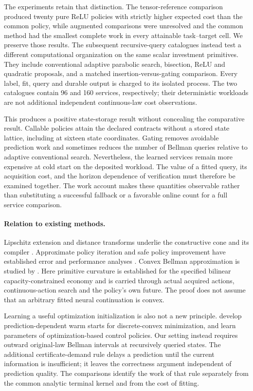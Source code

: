 \documentclass[ecta,nameyear,draft]{econsocart}
\begin{document}
The experiments retain that distinction. The tensor-reference comparison produced twenty pure ReLU policies with strictly higher expected cost than the common policy, while augmented comparisons were unresolved and the common method had the smallest complete work in every attainable task--target cell. We preserve those results. The subsequent recursive-query catalogues instead test a different computational organization on the same scalar investment primitives. They include conventional adaptive parabolic search, bisection, ReLU and quadratic proposals, and a matched insertion-versus-gating comparison. Every label, fit, query and durable output is charged to its isolated process. The two catalogues contain 96 and 160 services, respectively; their deterministic workloads are not additional independent continuous-law cost observations.

This produces a positive state-storage result without concealing the comparative result. Callable policies attain the declared contracts without a stored state lattice, including at sixteen state coordinates. Gating removes avoidable prediction work and sometimes reduces the number of Bellman queries relative to adaptive conventional search. Nevertheless, the learned services remain more expensive at cold start on the deposited workload. The value of a fitted query, its acquisition cost, and the horizon dependence of verification must therefore be examined together. The work account makes these quantities observable rather than substituting a successful fallback or a favorable online count for a full service comparison.

\paragraph{Relation to existing methods.}
Lipschitz extension and distance transforms underlie the constructive cone and its compiler \citep{mcshane1934,felzenszwalb2012}. Approximate policy iteration and safe policy improvement have established error and performance analyses \citep{munos2003,pirotta2013,scherrer2015}. Convex Bellman approximation is studied by \citet{yang2020convex}. Here primitive curvature is established for the specified bilinear capacity-constrained economy and is carried through actual acquired actions, continuous-action search and the policy's own future. The proof does not assume that an arbitrary fitted neural continuation is convex.

Learning a useful optimization initialization is also not a new principle. \citet{sakaue2023warm} develop prediction-dependent warm starts for discrete-convex minimization, and \citet{agrawal2020control} learn parameters of optimization-based control policies. Our setting instead requires outward original-law Bellman intervals at recursively queried states. The additional certificate-demand rule delays a prediction until the current information is insufficient; it leaves the correctness argument independent of prediction quality. The comparisons identify the work of that rule separately from the common analytic terminal kernel and from the cost of fitting.
\end{document}
